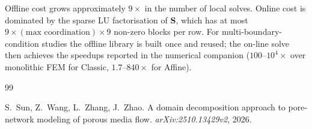 \documentclass[11pt,a4paper]{article}
\newcommand{\Schur}{\mathbf{S}}
\begin{document}
Offline cost grows approximately $9\times$ in the number of local solves.
Online cost is dominated by the sparse LU factorisation of $\Schur$,
which has at most $9 \times (\text{max coordination}) \times 9$
non-zero blocks per row.  For multi-boundary-condition studies the
offline library is built once and reused; the on-line solve then
achieves the speedups reported in the numerical companion
($100$--$10^4\times$ over monolithic FEM for Classic, $1.7$--$840\times$
for Affine).

\begin{thebibliography}{99}

S.~Sun, Z.~Wang, L.~Zhang, J.~Zhao.
\newblock A domain decomposition approach to pore-network modeling of porous
  media flow.
\newblock \textit{arXiv:2510.13429v2}, 2026.

\end{thebibliography}
\end{document}
